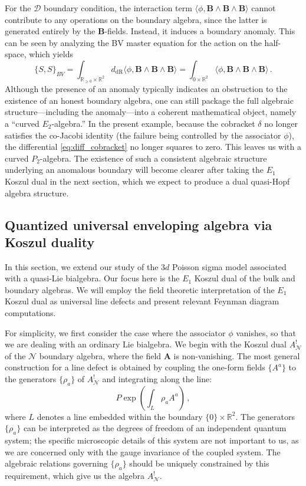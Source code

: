 \documentclass[11pt]{article}
\newcommand{\R}{\mathbb{R}}
\newcommand{\derham}{\mathrm{dR}}
\numberwithin{equation}{section}
\begin{document}
For the $\mathcal{D}$ boundary condition, the interaction term $\langle\phi,\boldsymbol{B}\wedge \boldsymbol{B}\wedge \boldsymbol{B}\rangle$ cannot contribute to any operations on the boundary algebra, since the latter is generated entirely by the $\boldsymbol{B}$-fields. Instead, it induces a boundary anomaly. This can be seen by analyzing the BV master equation for the action on the half-space, which yields
\begin{equation}
\{S,S\}_{BV}
= \int_{\R_{\geq 0}\times\R^2} d_{\derham}\langle\phi,\boldsymbol{B}\wedge \boldsymbol{B}\wedge \boldsymbol{B}\rangle
= \int_{{0}\times\R^2}\langle\phi,\boldsymbol{B}\wedge \boldsymbol{B}\wedge \boldsymbol{B}\rangle\,.
\end{equation}
Although the presence of an anomaly typically indicates an obstruction to the existence of an honest boundary algebra, one can still package the full algebraic structure—including the anomaly—into a coherent mathematical object, namely a ``curved $E_2$-algebra.'' In the present example, because the cobracket $\delta$ no longer satisfies the co-Jacobi identity (the failure being controlled by the associator $\phi$), the differential \eqref{eq:diff_cobracket} no longer squares to zero. This leaves us with a curved $P_2$-algebra. The existence of such a consistent algebraic structure underlying an anomalous boundary will become clearer after taking the $E_1$ Koszul dual in the next section, which we expect to produce a dual quasi-Hopf algebra structure.

\subsection{Quantized universal enveloping algebra via Koszul duality}
\label{sec:q_Liebi}
In this section, we extend our study of the $3d$ Poisson sigma model associated with a quasi-Lie bialgebra. Our focus here is the $E_1$ Koszul dual of the bulk and boundary algebras. We will employ the field theoretic interpretation of the $E_1$ Koszul dual as universal line defects and present relevant Feynman diagram computations.

For simplicity, we first consider the case where the associator $\phi$ vanishes, so that we are dealing with an ordinary Lie bialgebra. We begin with the Koszul dual $A^!_{\mathcal{N}}$ of the $\mathcal{N}$ boundary algebra, where the field $\boldsymbol{A}$ is non-vanishing. The most general construction for a line defect is obtained by coupling the one-form fields $\{A^a\}$ to the generators $\{\rho_a\}$ of $A^!_{\mathcal{N}}$ and integrating along the line:
\begin{equation}
	P\exp\left(\int_{L}\rho_aA^a\right)\,,
\end{equation}
where $L$ denotes a line embedded within the boundary $\{0\} \times \mathbb{R}^2$. The generators $\{\rho_a\}$ can be interpreted as the degrees of freedom of an independent quantum system; the specific microscopic details of this system are not important to us, as we are concerned only with the gauge invariance of the coupled system. The algebraic relations governing $\{\rho_a\}$ should be uniquely constrained by this requirement, which give us the algebra $A^!_{\mathcal{N}}$.
\end{document}
